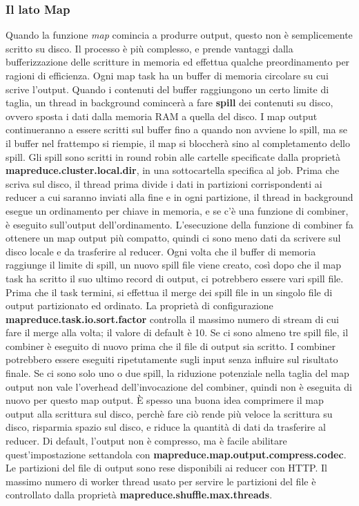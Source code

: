 \subsubsection{Il lato Map}
Quando la funzione \textit{map} comincia a produrre output, questo non è semplicemente scritto su disco. Il processo è più complesso, e prende vantaggi dalla bufferizzazione delle scritture in memoria ed effettua qualche preordinamento per ragioni di efficienza. Ogni map task ha un buffer di memoria circolare su cui scrive l'output. Quando i contenuti del buffer raggiungono un certo limite di taglia, un thread in background comincerà a fare \textbf{spill} dei contenuti su disco, ovvero sposta i dati  dalla memoria RAM a quella del disco. I map output continueranno a essere scritti sul buffer fino a quando non avviene lo spill, ma se il buffer nel frattempo si riempie, il map si bloccherà sino al completamento dello spill. Gli spill sono scritti in round robin alle cartelle specificate dalla proprietà \textbf{mapreduce.cluster.local.dir}, in una sottocartella specifica al job. Prima che scriva sul disco, il thread prima divide i dati in partizioni corrispondenti ai reducer a cui saranno inviati alla fine e in ogni partizione, il thread in background esegue un ordinamento per chiave in memoria, e se c'è una funzione di combiner, è eseguito sull'output dell'ordinamento. L'esecuzione della funzione di combiner fa ottenere un map output più compatto, quindi ci sono meno dati da scrivere sul disco locale e da trasferire al reducer. Ogni volta che il buffer di memoria raggiunge il limite di spill, un nuovo spill file viene creato, così dopo che il map task ha scritto il suo ultimo record di output, ci potrebbero essere vari spill file. Prima che il task termini, si effettua il merge dei spill file in un singolo file di output partizionato ed ordinato. La proprietà di configurazione \textbf{mapreduce.task.io.sort.factor} controlla il massimo numero di stream di cui fare il merge alla volta; il valore di default è 10. Se ci sono almeno tre spill file, il combiner è eseguito di nuovo prima che il file di output sia scritto. I combiner potrebbero essere eseguiti ripetutamente sugli input senza influire sul risultato finale. Se ci sono solo uno o due spill, la riduzione potenziale nella taglia del map output non vale l'overhead dell'invocazione del combiner, quindi non è eseguita di nuovo per questo map output. È spesso una buona idea comprimere il map output alla scrittura sul disco, perchè fare ciò rende più veloce la scrittura su disco, risparmia spazio sul disco, e riduce la quantità di dati da trasferire al reducer. Di default, l'output non è compresso, ma è facile abilitare quest'impostazione settandola con \textbf{mapreduce.map.output.compress.codec}. Le partizioni del file di output sono rese disponibili ai reducer con HTTP. Il massimo numero di worker thread usato per servire le partizioni del file è controllato dalla proprietà \textbf{mapreduce.shuffle.max.threads}.
